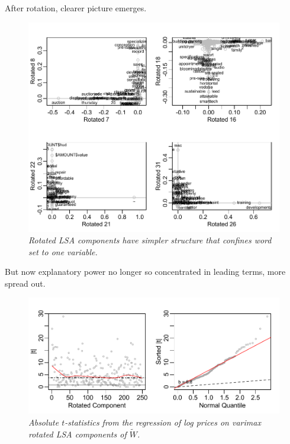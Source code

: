 \documentclass[12pt]{article}
\begin{document}
After rotation, clearer picture emerges. 

\begin{figure}
\caption{  \label{fig:rotcomponents}
  {\sl Rotated LSA components have simpler structure that confines word set to
one variable.}
}
  \centerline{ \includegraphics[width=5in]{figures/rot_components.pdf} }
\end{figure}


But now explanatory power no longer so concentrated in leading terms, more
spread out.

\begin{figure}
\caption{  \label{fig:rottstats}  
  {\sl Absolute $t$-statistics from the regression of log prices on varimax rotated LSA components of $\widetilde{W}$.}  }
  \centerline{ \includegraphics[width=5in]{figures/rot_tstats.pdf} }
\end{figure}
\end{document}
